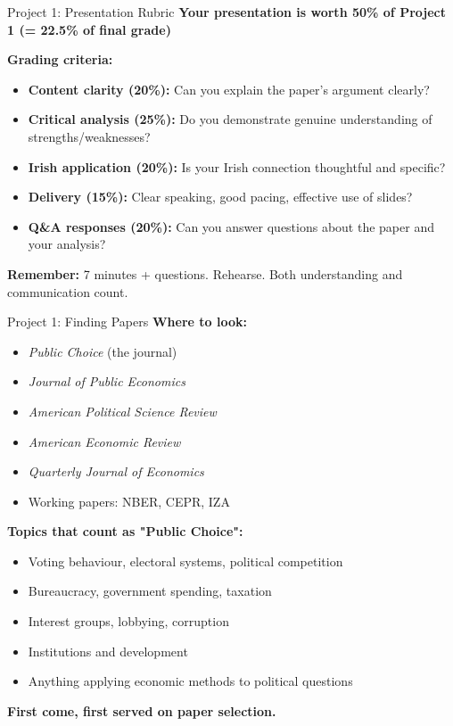 \documentclass[10pt]{beamer}
\begin{document}
\begin{frame}{Project 1: Presentation Rubric}
\textbf{Your presentation is worth 50\% of Project 1 (= 22.5\% of final grade)}

\vspace{0.2cm}
\textbf{Grading criteria:}
\begin{itemize}
\item \textbf{Content clarity (20\%):} Can you explain the paper's argument clearly?
\item \textbf{Critical analysis (25\%):} Do you demonstrate genuine understanding of strengths/weaknesses?
\item \textbf{Irish application (20\%):} Is your Irish connection thoughtful and specific?
\item \textbf{Delivery (15\%):} Clear speaking, good pacing, effective use of slides?
\item \textbf{Q\&A responses (20\%):} Can you answer questions about the paper and your analysis?
\end{itemize}

\vspace{0.2cm}
\textbf{Remember:} 7 minutes + questions. Rehearse. Both understanding and communication count.
\end{frame}

\begin{frame}{Project 1: Finding Papers}
\textbf{Where to look:}
\begin{itemize}
\item \textit{Public Choice} (the journal)
\item \textit{Journal of Public Economics}
\item \textit{American Political Science Review}
\item \textit{American Economic Review}
\item \textit{Quarterly Journal of Economics}
\item Working papers: NBER, CEPR, IZA
\end{itemize}


\textbf{Topics that count as "Public Choice":}
\begin{itemize}
\item Voting behaviour, electoral systems, political competition
\item Bureaucracy, government spending, taxation
\item Interest groups, lobbying, corruption
\item Institutions and development
\item Anything applying economic methods to political questions
\end{itemize}


\textbf{First come, first served on paper selection.}
\end{frame}
\end{document}
